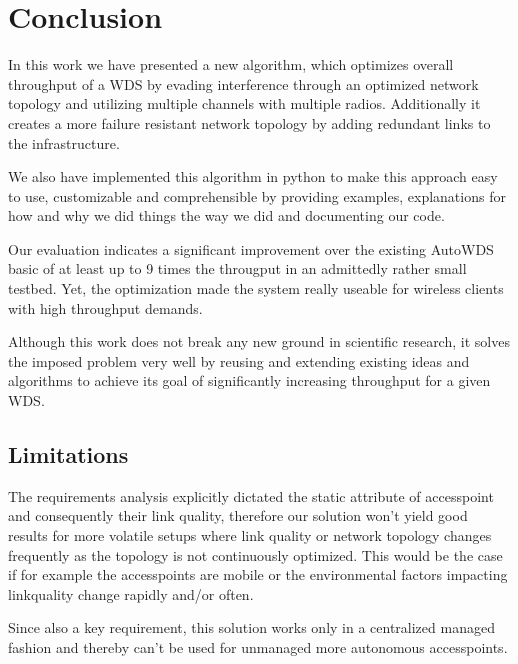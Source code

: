 \chapter{Conclusion}
  In this work we have presented a new algorithm, which optimizes overall throughput of a \ac{WDS} by evading interference through an optimized network topology 
  and utilizing multiple channels with multiple radios. Additionally it creates a more failure resistant network topology by adding redundant links to the infrastructure.
  
  We also have implemented this algorithm in python to make this approach easy to use, customizable and comprehensible by providing examples, explanations for how and why we 
  did things the way we did and documenting our code.
  
  Our evaluation indicates a significant improvement over the existing AutoWDS basic of at least up to 9 times the througput in an admittedly rather small testbed.
  Yet, the optimization made the system really useable for wireless clients with high throughput demands.
  
  Although this work does not break any new ground in scientific research, it solves the imposed problem very well by reusing and extending existing ideas and algorithms to
  achieve its goal of significantly increasing throughput for a given \ac{WDS}.
  
  \section{Limitations}
    The requirements analysis explicitly dictated the static attribute of accesspoint and consequently their link quality, therefore our solution won't yield good 
    results for more volatile setups where link quality or network topology changes frequently as the topology is not continuously optimized. 
    This would be the case if for example the accesspoints are mobile or the environmental factors impacting linkquality change rapidly and/or often.
    
    Since also a key requirement, this solution works only in a centralized managed fashion and thereby can't be used for unmanaged more autonomous accesspoints.
    
